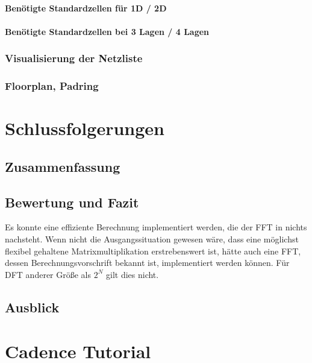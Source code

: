 \subsubsection{Benötigte Standardzellen für 1D / 2D}
 \subsubsection{Benötigte Standardzellen bei 3 Lagen / 4 Lagen}
 \subsection{Visualisierung der Netzliste}
 \subsection{Floorplan, Padring}
 
 \chapter{Schlussfolgerungen}
 \section{Zusammenfassung}
 \section{Bewertung und Fazit}
 Es konnte eine effiziente Berechnung implementiert werden, die der FFT in nichts nachsteht. Wenn nicht die Ausgangssituation gewesen wäre, dass eine möglichst flexibel gehaltene
 Matrixmultiplikation erstrebenswert ist, hätte auch eine FFT, dessen Berechnungsvorschrift bekannt ist, implementiert werden können. Für DFT anderer Größe als $2^N$ gilt dies nicht.
 
 
 \section{Ausblick}
 
 
 \printglossary[title={Abkürzungsverzeichnis}] 
 
 \listoffigures

 \listoftables

 
 \printbibliography
 
 \appendix
 
 \chapter{Cadence Tutorial}
 
 
 

